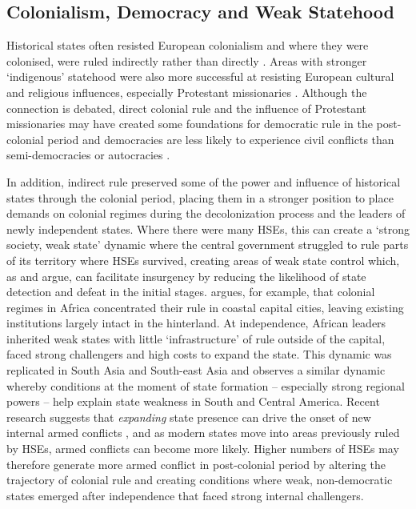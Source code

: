 
\subsection{Colonialism, Democracy and Weak Statehood}

Historical states often resisted European colonialism and where they were
colonised, were ruled indirectly rather than directly \citep{Gerring2011,
Hariri2012, Englebert2000}. Areas with stronger `indigenous' statehood were also
more successful at resisting European cultural and religious influences,
especially Protestant missionaries \citep{Woodberry2012}. Although the
connection is debated, direct colonial rule and the influence of Protestant
missionaries may have created some foundations for democratic rule in the
post-colonial period \citep{Woodberry2012, Hariri2012} and democracies are less
likely to experience civil conflicts than semi-democracies or autocracies
\citep{Hegre2006}.

In addition, indirect rule preserved some of the power and influence of
historical states through the colonial period, placing them in a stronger
position to place demands on colonial regimes during the decolonization process
and the leaders of newly independent states. Where there were many HSEs, this
can create a `strong society, weak state' dynamic where the central government
struggled to rule parts of its territory where HSEs survived, creating areas of
weak state control which, as \citet{Fearon2003} and \citet{Lewis2017} argue, can
facilitate insurgency by reducing the likelihood of state detection and defeat
in the initial stages. \citet{Herbst2014} argues, for example, that colonial
regimes in Africa concentrated their rule in coastal capital cities, leaving
existing institutions largely intact in the hinterland. At independence, African
leaders inherited weak states with little `infrastructure' of rule outside of
the capital, faced strong challengers and high costs to expand the state. This
dynamic was replicated in South Asia and South-east Asia \citep{Migdal1988} and \citet{Mazzuca2021} observes a similar dynamic whereby conditions at the moment of state formation -- especially strong regional powers -- help explain state weakness in South and Central America.
Recent research suggests that \textit{expanding} state presence can drive the
onset of new internal armed conflicts \citep{Ying2020}, and as modern states
move into areas previously ruled by HSEs, armed conflicts can become more
likely. Higher numbers of HSEs may therefore generate more armed conflict in
post-colonial period by altering the trajectory of colonial rule and creating
conditions where weak, non-democratic states emerged after independence that
faced strong internal challengers. 

